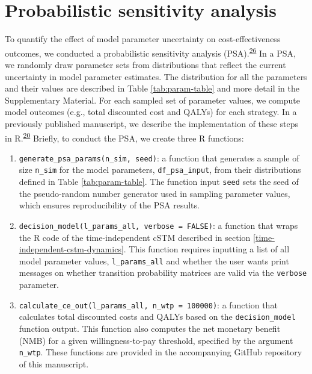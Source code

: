 \documentclass[
]{article}
\begin{document}
\hypertarget{probabilistic-sensitivity-analysis}{%
\section{Probabilistic sensitivity analysis}\label{probabilistic-sensitivity-analysis}}

To quantify the effect of model parameter uncertainty on cost-effectiveness outcomes, we conducted a probabilistic sensitivity analysis (PSA).\textsuperscript{\protect\hyperlink{ref-Briggs2012}{26}} In a PSA, we randomly draw parameter sets from distributions that reflect the current uncertainty in model parameter estimates. The distribution for all the parameters and their values are described in Table \ref{tab:param-table} and more detail in the Supplementary Material. For each sampled set of parameter values, we compute model outcomes (e.g., total discounted cost and QALYs) for each strategy. In a previously published manuscript, we describe the implementation of these steps in R.\textsuperscript{\protect\hyperlink{ref-Alarid-Escudero2019e}{20}} Briefly, to conduct the PSA, we create three R functions:

\begin{enumerate}
\def\labelenumi{\arabic{enumi}.}
\item
  \texttt{generate\_psa\_params(n\_sim,\ seed)}: a function that generates a sample of size \texttt{n\_sim} for the model parameters, \texttt{df\_psa\_input}, from their distributions defined in Table \ref{tab:param-table}. The function input \texttt{seed} sets the seed of the pseudo-random number generator used in sampling parameter values, which ensures reproducibility of the PSA results.
\item
  \texttt{decision\_model(l\_params\_all,\ verbose\ =\ FALSE)}: a function that wraps the R code of the time-independent cSTM described in section \ref{time-independent-cstm-dynamics}. This function requires inputting a list of all model parameter values, \texttt{l\_params\_all} and whether the user wants print messages on whether transition probability matrices are valid via the \texttt{verbose} parameter.
\item
  \texttt{calculate\_ce\_out(l\_params\_all,\ n\_wtp\ =\ 100000)}: a function that calculates total discounted costs and QALYs based on the \texttt{decision\_model} function output. This function also computes the net monetary benefit (NMB) for a given willingness-to-pay threshold, specified by the argument \texttt{n\_wtp}.
  These functions are provided in the accompanying GitHub repository of this manuscript.
\end{enumerate}
\end{document}
